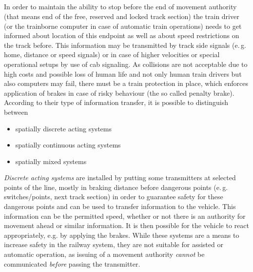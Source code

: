 \documentclass[a4paper, 12pt]{scrartcl}
\begin{document}
\subsection{}
In order to maintain the ability to stop before the end of movement authority (that means end of the free, reserved and locked track section) the train driver (or the trainborne computer in case of automatic train operations) needs to get informed about 
location of this endpoint as well as about speed restrictions on the track before. This information may be transmitted by track side signals (e.\,g. home, distance or speed signals) or in case of higher velocities or special operational setups by use of cab signaling. As collisions are not acceptable due to high costs and possible loss of human life and not only human train drivers but also computers may fail, there must be a train protection in place, which enforces application of brakes in case of risky behaviour (the so called penalty brake). According to their type of information transfer, it is possible to distinguish between
 \begin{itemize}
	\item spatially discrete acting systems
	\item spatially continuous acting systems
	\item spatially mixed systems
\end{itemize}
\emph{Discrete acting systems} are installed by putting some transmitters at selected points of the line, mostly in braking distance before dangerous points 
(e.\,g. switches/points, next track section) in order to guarantee safety for these dangerous points and can be used to transfer information to the vehicle. This information can be the permitted speed, whether or not there is an authority for movement ahead or similar information. It is then possible for the vehicle to react appropriately, e.g. by applying the brakes. While these systems are a means to increase safety in the railway system, they are not suitable for assisted or automatic operation, as issuing of a movement authority \emph{cannot} be communicated \emph{before} passing the transmitter. \\
\end{document}
